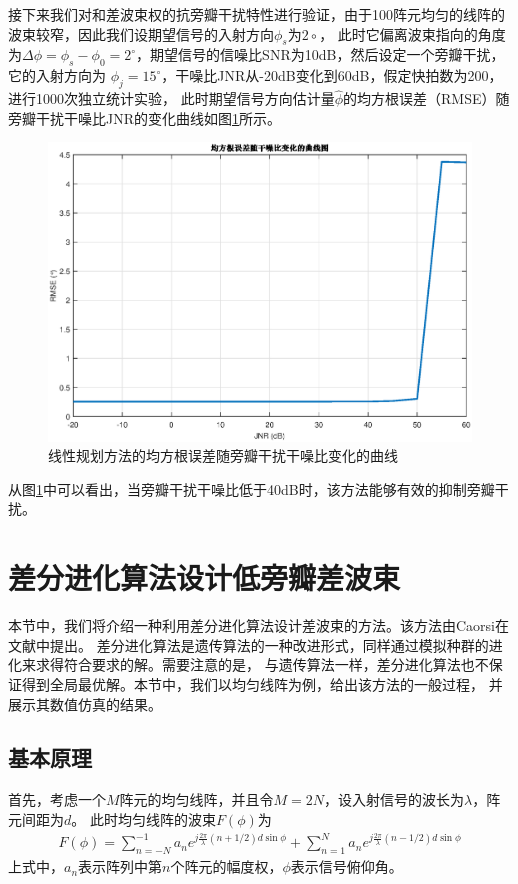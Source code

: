 \documentclass[master]{thesis-uestc}
\begin{document}
接下来我们对和差波束权的抗旁瓣干扰特性进行验证，由于100阵元均匀的线阵的波束较窄，因此我们设期望信号的入射方向$\phi_s$为$2\circ$，
此时它偏离波束指向的角度为$\Delta\phi=\phi_s-\phi_0=2^\circ$，期望信号的信噪比SNR为10dB，然后设定一个旁瓣干扰，它的入射方向为
$\phi_j=15^\circ$，干噪比JNR从-20dB变化到60dB，假定快拍数为200，进行1000次独立统计实验，
此时期望信号方向估计量$\hat{\phi}$的均方根误差（RMSE）随旁瓣干扰干噪比JNR的变化曲线如图\ref{LP_RMSE_JNR}所示。
\begin{figure}[H]
    \includegraphics[scale=0.5]{pic/LP_RMSE_JNR.eps}
    \caption{线性规划方法的均方根误差随旁瓣干扰干噪比变化的曲线}
    \label{LP_RMSE_JNR}
\end{figure}

从图\ref{LP_RMSE_JNR}中可以看出，当旁瓣干扰干噪比低于40dB时，该方法能够有效的抑制旁瓣干扰。

\section{差分进化算法设计低旁瓣差波束}
本节中，我们将介绍一种利用差分进化算法设计差波束的方法。该方法由Caorsi在文献\cite{Caorsi}中提出。
差分进化算法是遗传算法的一种改进形式，同样通过模拟种群的进化来求得符合要求的解。需要注意的是，
与遗传算法一样，差分进化算法也不保证得到全局最优解。本节中，我们以均匀线阵为例，给出该方法的一般过程，
并展示其数值仿真的结果。

\subsection{基本原理}
首先，考虑一个$M$阵元的均匀线阵，并且令$M=2N$，设入射信号的波长为$\lambda$，阵元间距为$d$。
此时均匀线阵的波束$F(\phi)$为
\begin{equation}\label{de_pattern_fromula}
    \begin{aligned}
        F(\phi) = \sum_{n=-N}^{-1}a_ne^{j\frac{2\pi}{\lambda}\left(n+1/2\right)d\sin\phi} +
        \sum_{n=1}^{N}a_ne^{j\frac{2\pi}{\lambda}\left(n-1/2\right)d\sin\phi}
    \end{aligned}
\end{equation}
上式中，$a_n$表示阵列中第$n$个阵元的幅度权，$\phi$表示信号俯仰角。
\end{document}
